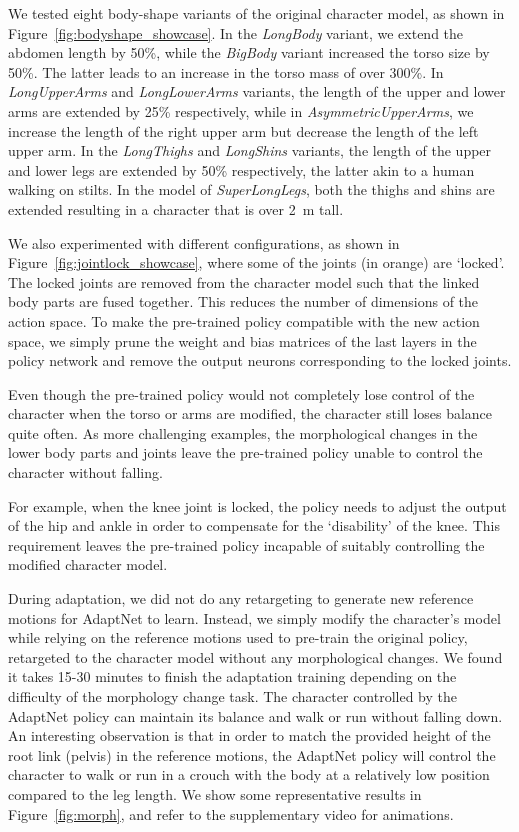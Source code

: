 We tested eight body-shape variants of the original character model, as shown in Figure~\ref{fig:bodyshape_showcase}.
In the \textit{LongBody} variant, we extend the abdomen length by 50\%, 
while the \textit{BigBody} variant increased the torso size by 50\%.
The latter leads to an increase in the torso mass of over 300\%.
In \textit{LongUpperArms} and \textit{LongLowerArms} variants, the length of the upper and lower arms are extended by 25\% respectively,
while in \textit{AsymmetricUpperArms}, we increase the length of the right upper arm 
but decrease the length of the left upper arm.
In the \textit{LongThighs} and \textit{LongShins} variants, the length of the upper and lower legs are extended by 50\% respectively,
the latter akin to a human walking on stilts.
In the model of \textit{SuperLongLegs}, both the thighs and shins are extended resulting in a character that is over 2~m tall.%

We also experimented with different configurations, as shown in Figure~\ref{fig:jointlock_showcase}, 
where some of the joints (in orange) are `locked'.
The locked joints are removed from the character model such that the linked body parts are %
fused together.
This reduces the number of dimensions of the action space. 
To make the pre-trained policy compatible with the new action space, %
we simply prune the weight and bias matrices of the last layers in the policy network
and remove the output neurons corresponding to the locked joints.

Even though the pre-trained policy would not completely lose control of the character when  %
the torso or arms are modified,
the character %
still loses balance quite often.
As more challenging examples,
the morphological changes in the lower body parts and joints
leave the pre-trained policy unable to control the character without falling.

For example, when the knee joint is locked, %
the policy needs to adjust the output of the hip and ankle in order to compensate for the `disability' of the knee.
This requirement leaves the pre-trained policy incapable of suitably controlling the modified character model.%

During adaptation, we did not do any retargeting to generate new reference motions for AdaptNet to learn.
Instead, %
we simply modify the character's model while relying on the reference motions used to pre-train the original policy, retargeted to the character model without any morphological changes. %
We found it takes 15-30 minutes to finish the adaptation training depending on the difficulty of the morphology change task.
The character controlled by the AdaptNet policy can maintain its balance and walk or run without falling down. 
An interesting observation is that 
in order to match the provided height of the root link (pelvis) in the reference motions, the
AdaptNet policy will control the character to walk or run in a crouch with the body at a relatively low position compared to the leg length.
We show some representative %
results in Figure~\ref{fig:morph},
and refer to the supplementary video for animations. %

